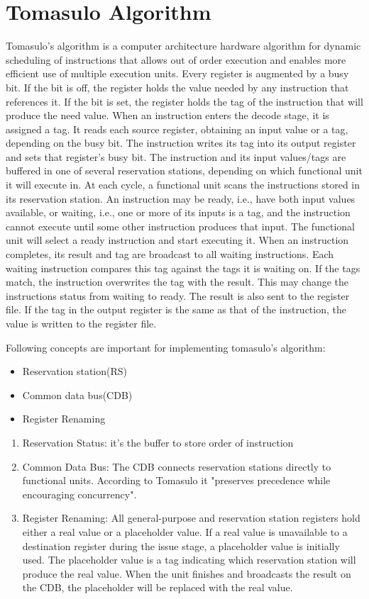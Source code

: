 \section{Tomasulo Algorithm}
Tomasulo’s algorithm is a computer architecture hardware algorithm for dynamic scheduling of instructions that allows out of order execution and enables more efficient use of multiple execution units. Every register is augmented by a busy bit. If the bit is off, the register holds the value needed by any instruction that references it. If the bit is set, the register holds the tag of the instruction that will produce the need value. When an instruction enters the decode stage, it is assigned a tag. It reads each source register, obtaining an input value or a tag, depending on the busy bit. The instruction writes its tag into its output register and sets that register’s busy bit. The instruction and its input values/tags are buffered in one of several reservation stations, depending on which functional unit it will execute in. At each cycle, a functional unit scans the instructions stored in its reservation station. An instruction may be ready, i.e., have both input values available, or waiting, i.e., one or more of its inputs is a tag, and the instruction cannot execute until some other instruction produces that input. The functional unit will select a ready instruction and start executing it. When an instruction completes, its result and tag are broadcast to all waiting instructions. Each waiting instruction compares this tag against the tags it is waiting on. If the tags match, the instruction overwrites the tag with the result. This may change the instructions status from waiting to ready. The result is also sent to the register file. If the tag in the output register is the same as that of the instruction, the value is written to the register file.

Following concepts are important for implementing tomasulo’s algorithm:
\begin{itemize}
  \item Reservation station(RS)
  \item Common data bus(CDB)
  \item Register Renaming
\end{itemize}

\begin{enumerate}
  \item Reservation Status: it’s the buffer to store order of instruction
  \item Common Data Bus: The CDB connects reservation stations directly to functional units. According to Tomasulo it "preserves precedence while encouraging concurrency".
  \item Register Renaming: All general-purpose and reservation station registers hold either a real value or a placeholder value. If a real value is unavailable to a destination register during the issue stage, a placeholder value is initially used. The placeholder value is a tag indicating which reservation station will produce the real value. When the unit finishes and broadcasts the result on the CDB, the placeholder will be replaced with the real value.
\end{enumerate}